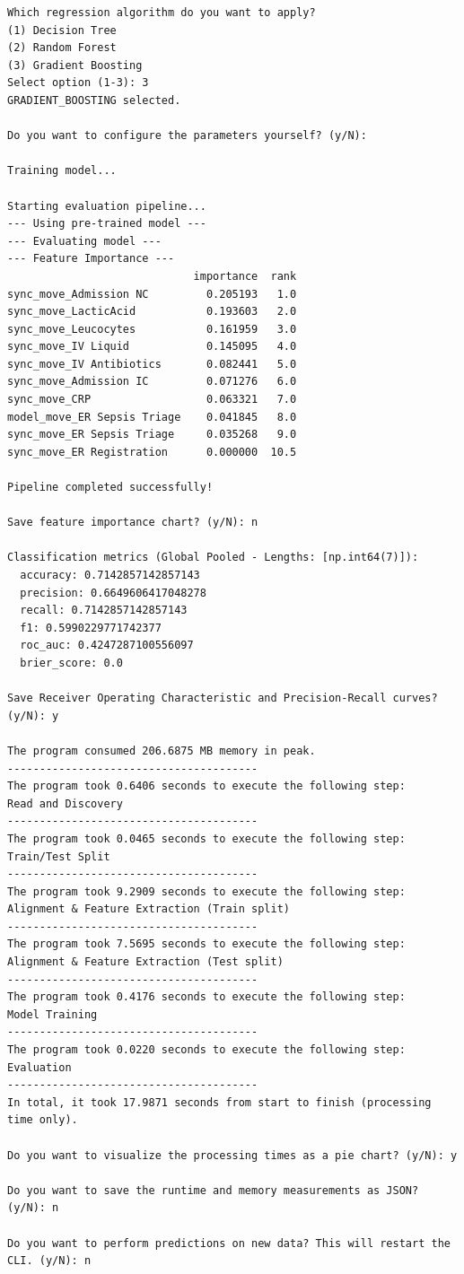\documentclass[12pt,a4paper]{article}
\begin{document}
\begin{verbatim}
Which regression algorithm do you want to apply?
(1) Decision Tree
(2) Random Forest
(3) Gradient Boosting
Select option (1-3): 3
GRADIENT_BOOSTING selected.

Do you want to configure the parameters yourself? (y/N): 

Training model...

Starting evaluation pipeline...
--- Using pre-trained model ---
--- Evaluating model ---
--- Feature Importance ---
                             importance  rank
sync_move_Admission NC         0.205193   1.0
sync_move_LacticAcid           0.193603   2.0
sync_move_Leucocytes           0.161959   3.0
sync_move_IV Liquid            0.145095   4.0
sync_move_IV Antibiotics       0.082441   5.0
sync_move_Admission IC         0.071276   6.0
sync_move_CRP                  0.063321   7.0
model_move_ER Sepsis Triage    0.041845   8.0
sync_move_ER Sepsis Triage     0.035268   9.0
sync_move_ER Registration      0.000000  10.5

Pipeline completed successfully!

Save feature importance chart? (y/N): n

Classification metrics (Global Pooled - Lengths: [np.int64(7)]):
  accuracy: 0.7142857142857143
  precision: 0.6649606417048278
  recall: 0.7142857142857143
  f1: 0.5990229771742377
  roc_auc: 0.4247287100556097
  brier_score: 0.0

Save Receiver Operating Characteristic and Precision-Recall curves? (y/N): y

The program consumed 206.6875 MB memory in peak.
---------------------------------------
The program took 0.6406 seconds to execute the following step: 
Read and Discovery
---------------------------------------
The program took 0.0465 seconds to execute the following step: 
Train/Test Split
---------------------------------------
The program took 9.2909 seconds to execute the following step: 
Alignment & Feature Extraction (Train split)
---------------------------------------
The program took 7.5695 seconds to execute the following step: 
Alignment & Feature Extraction (Test split)
---------------------------------------
The program took 0.4176 seconds to execute the following step: 
Model Training
---------------------------------------
The program took 0.0220 seconds to execute the following step: 
Evaluation
---------------------------------------
In total, it took 17.9871 seconds from start to finish (processing time only).

Do you want to visualize the processing times as a pie chart? (y/N): y

Do you want to save the runtime and memory measurements as JSON? (y/N): n

Do you want to perform predictions on new data? This will restart the CLI. (y/N): n


\end{verbatim}
\end{document}
